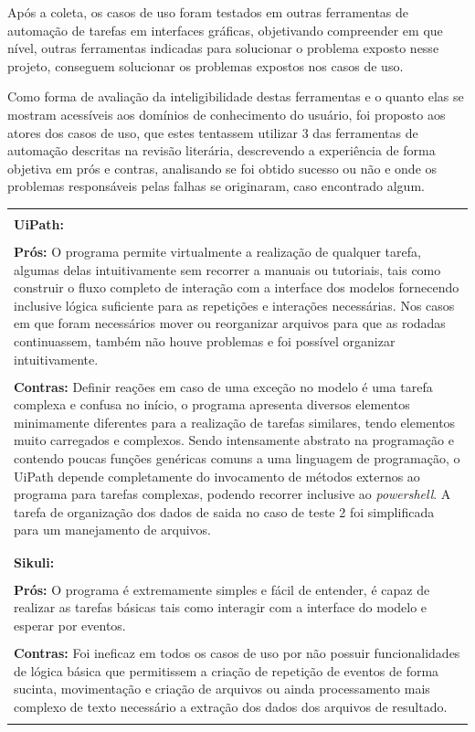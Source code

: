 \documentclass[tg]{mdtufsm}
\begin{document}
	Após a coleta, os casos de uso foram testados em outras ferramentas de automação de tarefas em interfaces gráficas, objetivando compreender em que nível, outras ferramentas indicadas para solucionar o problema exposto nesse projeto, conseguem solucionar os problemas expostos nos casos de uso.

	Como forma de avaliação da inteligibilidade destas ferramentas e o quanto elas se mostram acessíveis aos domínios de conhecimento do usuário, foi proposto aos atores dos casos de uso, que estes tentassem utilizar 3 das ferramentas de automação descritas na revisão literária, descrevendo a experiência de forma objetiva em prós e contras, analisando se foi obtido sucesso ou não e onde os problemas responsáveis pelas falhas se originaram, caso encontrado algum.
	\bigskip


		{\centering \begin{tabular}{ | m{15.6cm} | }
		\hline \\

		{\bf UiPath:} \\ \\
		{\bf Prós:} O programa permite virtualmente a realização de qualquer tarefa, algumas delas intuitivamente sem recorrer a manuais ou tutoriais, tais como construir o fluxo completo de interação com a interface dos modelos fornecendo inclusive lógica suficiente para as repetições e interações necessárias. Nos casos em que foram necessários mover ou reorganizar arquivos para que as rodadas continuassem, também não houve problemas e foi possível organizar intuitivamente. \\ \\
		{\bf Contras:} Definir reações em caso de uma exceção no modelo é uma tarefa complexa e confusa no início, o programa apresenta diversos elementos minimamente diferentes para a realização de tarefas similares, tendo elementos muito carregados e complexos. Sendo intensamente abstrato na programação e contendo poucas funções genéricas comuns a uma linguagem de programação, o UiPath depende completamente do invocamento de métodos externos ao programa para tarefas complexas, podendo recorrer inclusive ao \emph{powershell}. A tarefa de organização dos dados de saida no caso de teste 2 foi simplificada para um manejamento de arquivos. \\ \\

		\hline \hline \\

		{\bf Sikuli:} \\ \\
		{\bf Prós:} O programa é extremamente simples e fácil de entender, é capaz de realizar as tarefas básicas tais como interagir com a interface do modelo e esperar por eventos. \\ \\
		{\bf Contras:} Foi ineficaz em todos os casos de uso por não possuir funcionalidades de lógica básica que permitissem a criação de repetição de eventos de forma sucinta, movimentação e criação de arquivos ou ainda processamento mais complexo de texto necessário a extração dos dados dos arquivos de resultado. \\ \\


\end{tabular}}
\end{document}
